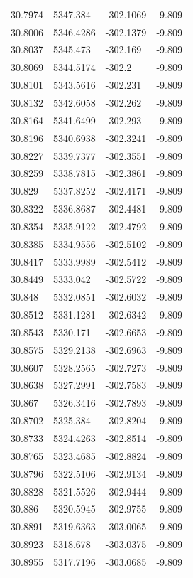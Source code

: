 \begin{table}[H]
\begin{tabular}{llll}
30.7974 & 5347.384 & -302.1069 & -9.809 \\
30.8006 & 5346.4286 & -302.1379 & -9.809 \\
30.8037 & 5345.473 & -302.169 & -9.809 \\
30.8069 & 5344.5174 & -302.2 & -9.809 \\
30.8101 & 5343.5616 & -302.231 & -9.809 \\
30.8132 & 5342.6058 & -302.262 & -9.809 \\
30.8164 & 5341.6499 & -302.293 & -9.809 \\
30.8196 & 5340.6938 & -302.3241 & -9.809 \\
30.8227 & 5339.7377 & -302.3551 & -9.809 \\
30.8259 & 5338.7815 & -302.3861 & -9.809 \\
30.829 & 5337.8252 & -302.4171 & -9.809 \\
30.8322 & 5336.8687 & -302.4481 & -9.809 \\
30.8354 & 5335.9122 & -302.4792 & -9.809 \\
30.8385 & 5334.9556 & -302.5102 & -9.809 \\
30.8417 & 5333.9989 & -302.5412 & -9.809 \\
30.8449 & 5333.042 & -302.5722 & -9.809 \\
30.848 & 5332.0851 & -302.6032 & -9.809 \\
30.8512 & 5331.1281 & -302.6342 & -9.809 \\
30.8543 & 5330.171 & -302.6653 & -9.809 \\
30.8575 & 5329.2138 & -302.6963 & -9.809 \\
30.8607 & 5328.2565 & -302.7273 & -9.809 \\
30.8638 & 5327.2991 & -302.7583 & -9.809 \\
30.867 & 5326.3416 & -302.7893 & -9.809 \\
30.8702 & 5325.384 & -302.8204 & -9.809 \\
30.8733 & 5324.4263 & -302.8514 & -9.809 \\
30.8765 & 5323.4685 & -302.8824 & -9.809 \\
30.8796 & 5322.5106 & -302.9134 & -9.809 \\
30.8828 & 5321.5526 & -302.9444 & -9.809 \\
30.886 & 5320.5945 & -302.9755 & -9.809 \\
30.8891 & 5319.6363 & -303.0065 & -9.809 \\
30.8923 & 5318.678 & -303.0375 & -9.809 \\
30.8955 & 5317.7196 & -303.0685 & -9.809 \\

\end{tabular}
\end{table}
